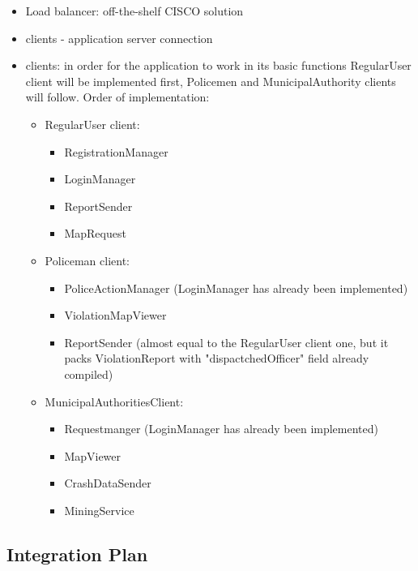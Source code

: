 \begin{itemize}
	\item Load balancer: off-the-shelf CISCO solution
	\item clients - application server connection
	\item clients: in order for the application to work in its basic functions RegularUser client will be implemented first, Policemen and MunicipalAuthority clients will follow.\newline
	Order of implementation:
		\begin{itemize}
			\item RegularUser client:
			\begin{itemize}
				\item RegistrationManager
				\item LoginManager
				\item ReportSender
				\item MapRequest
			\end{itemize}
			\item Policeman client:
			\begin{itemize}
				\item PoliceActionManager (LoginManager has already been implemented)
				\item ViolationMapViewer
				\item ReportSender (almost equal to the RegularUser client one, but it packs ViolationReport with "dispactchedOfficer" field already compiled)
			\end{itemize}
			\item MunicipalAuthoritiesClient:
				\begin{itemize}
					\item Requestmanger (LoginManager has already been implemented)
					\item MapViewer
					\item CrashDataSender
					\item MiningService
				\end{itemize} 
			\end{itemize}
	\end{itemize} 

\subsection{Integration Plan}
